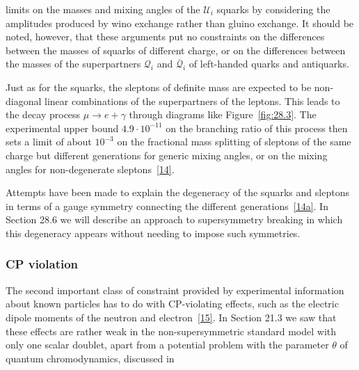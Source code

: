 
\noindent
limits on the masses and mixing angles of the \(\mathcal{U}_i\) squarks
by considering the amplitudes produced by wino exchange rather than
gluino exchange. It should be noted, however, that these arguments put no
constraints on the differences between the masses of squarks of different
charge, or on the differences between the masses of the superpartners
\(\mathcal{Q}_i\) and \(\overline{\mathcal{Q}}_i\) of left-handed quarks
and antiquarks.

Just as for the squarks, the sleptons of definite mass are expected to be
non-diagonal linear combinations of the superpartners of the leptons. This
leads to the decay process \(\mu\longrightarrow e+\gamma\) through
diagrams like Figure~\ref{fig:28.3}. The experimental upper bound
\(4.9\mathbin{\cdot}10^{-11}\) on the branching ratio of this process
then sets a limit of about \(10^{-3}\) on the fractional mass splitting of
sleptons of the same charge but different generations for generic mixing
angles, or on the mixing angles for non-degenerate
sleptons~\hyperref[ch28-ref-14]{[14]}.

Attempts have been made to explain the degeneracy of the squarks and
sleptons in terms of a gauge symmetry connecting the different
generations~\hyperref[ch28-ref-14a]{[14a]}. In Section 28.6 we will
describe an approach to supersymmetry breaking in which this degeneracy
appears without needing to impose such symmetries.

\subsubsection*{CP violation}

The second important class of constraint provided by experimental
information about known particles has to do with CP-violating effects,
such as the electric dipole moments of the neutron and
electron~\hyperref[ch28-ref-15]{[15]}. In Section 21.3 we saw that these
effects are rather weak in the non-supersymmetric standard model with only
one scalar doublet, apart from a potential problem with the parameter
\(\theta\) of quantum chromodynamics, discussed in


